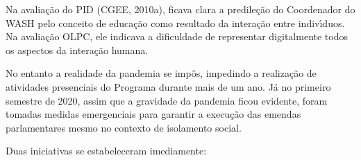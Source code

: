 \documentclass[
12pt,		%
openright,	%
twoside,  %
a4paper,			%
chapter=TITLE,		%
english,			%
french,				%
spanish,			%
brazil				%
]{USPSC-classe/USPSC}
\begin{document}
Na avalia\c{c}\~ao do PID  (CGEE, 2010a), ficava clara a predile\c{c}\~ao do Coordenador do WASH pelo conceito de educa\c{c}\~ao como resultado da intera\c{c}\~ao entre indiv\'{\i}duos. Na avalia\c{c}\~ao OLPC, ele indicava a dificuldade de representar digitalmente todos os aspectos da intera\c{c}\~ao humana.








No entanto a realidade da pandemia se imp\^os, impedindo a realiza\c{c}\~ao de atividades presenciais do Programa durante mais de um ano. J\'a no primeiro semestre de 2020, assim que a gravidade da pandemia ficou evidente, foram tomadas medidas emergenciais para garantir a execu\c{c}\~ao das emendas parlamentares mesmo no contexto de isolamento social.








Duas iniciativas se estabeleceram imediamente:
\end{document}
